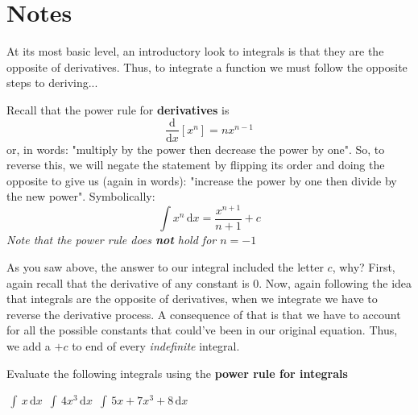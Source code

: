 \documentclass[addpoints]{exam}
\theoremstyle{definition}
\theoremstyle{plain}
\begin{document}
\section{Notes}
At its most basic level, an introductory look to integrals is that they are the opposite of derivatives. Thus, to integrate a function we must follow the opposite steps to deriving...
\begin{tcolorbox}[breakable, title=\subsection{POWER RULE FOR INTEGRALS}, colframe=black, sharp corners, colback=Azure4!30, colbacktitle=DodgerBlue3!60, coltitle=black]
    Recall that the power rule for \textbf{derivatives} is 
    \[
        \frac{\mathrm{d}}{\mathrm{d}x}\left[x^{n}\right] = nx^{n-1}
    \]
    or, in words: "multiply by the power then decrease the power by one". So, to reverse this, we will negate the statement by flipping its order and doing the opposite to give us (again in words): "increase the power by one then divide by the new power". Symbolically:
    \[
        \int x^{n}\,\mathrm{d}x = \frac{x^{n+1}}{n+1} + c
    \]
    \emph{Note that the power rule does \textbf{not} hold for $n=-1$}
    \begin{tcolorbox}[breakable, title=\subsubsection{CONSTANT OF INTEGRATION}, colframe=black, sharp corners, colback=Azure4!30, colbacktitle=Magenta3!80, coltitle=black]
        As you saw above, the answer to our integral included the letter $c$, why? First, again recall that the derivative of any constant is $0$. Now, again following the idea that integrals are the opposite of derivatives, when we integrate we have to reverse the derivative process. A consequence of that is that we have to account for all the possible constants that could've been in our original equation. Thus, we add a $+c$ to end of every \emph{indefinite} integral.
    \end{tcolorbox}
\end{tcolorbox}
Evaluate the following integrals using the \textbf{power rule for integrals}
\begin{questions}
    \question $\displaystyle\,\int\,x\,\mathrm{d}x$
    \question $\displaystyle\,\int\,4x^3\,\mathrm{d}x$
    \question $\displaystyle\,\int\,5x + 7x^3 + 8\,\mathrm{d}x$
\end{questions}
\end{document}
